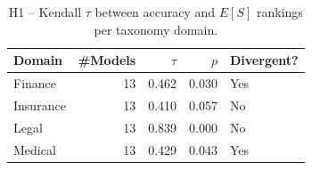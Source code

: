\begin{table}[t]\centering\small
\caption{H1 -- Kendall $\tau$ between accuracy and $E[S]$ rankings per
taxonomy domain.}\label{tab:h1}
\begin{tabular}{lrrrl}
\toprule
Domain & \#Models & $\tau$ & $p$ & Divergent? \\
\midrule
  Finance & 13 & 0.462 & 0.030 & Yes \\
  Insurance & 13 & 0.410 & 0.057 & No \\
  Legal & 13 & 0.839 & 0.000 & No \\
  Medical & 13 & 0.429 & 0.043 & Yes \\
\bottomrule
\end{tabular}
\end{table}